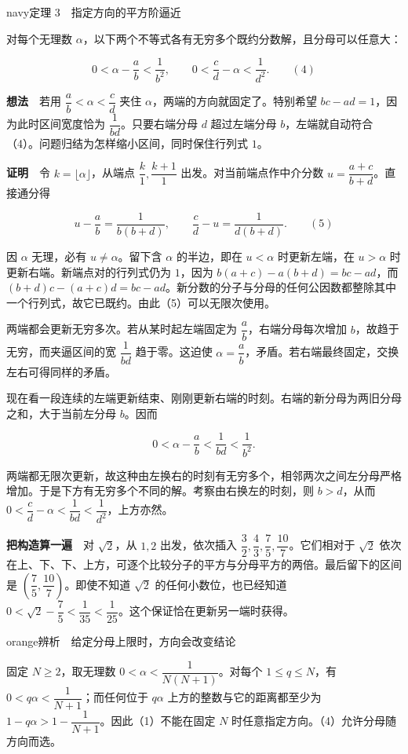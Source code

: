 \documentclass[11pt,a4paper]{article}
\begin{document}
\begin{sboxenv}{navy}{定理 3　指定方向的平方阶逼近}

对每个无理数 $\alpha$，以下两个不等式各有无穷多个既约分数解，且分母可以任意大：

\[
0<\alpha-\frac ab<\frac1{b^2},\qquad
0<\frac cd-\alpha<\frac1{d^2}.\qquad\mathrm{(4)}
\]
\end{sboxenv}

\textbf{想法}　若用 $\dfrac ab<\alpha<\dfrac cd$ 夹住 $\alpha$，两端的方向就固定了。特别希望 $bc-ad=1$，因为此时区间宽度恰为 $\dfrac1{bd}$。只要右端分母 $d$ 超过左端分母 $b$，左端就自动符合（4）。问题归结为怎样缩小区间，同时保住行列式 $1$。

\textbf{证明}　令 $k=\lfloor\alpha\rfloor$，从端点 $\dfrac k1,\dfrac{k+1}1$ 出发。对当前端点作中介分数 $u=\dfrac{a+c}{b+d}$。直接通分得

\[
u-\frac ab=\frac{1}{b(b+d)},\qquad
\frac cd-u=\frac{1}{d(b+d)}.\qquad\mathrm{(5)}
\]

因 $\alpha$ 无理，必有 $u\ne\alpha$。留下含 $\alpha$ 的半边，即在 $u<\alpha$ 时更新左端，在 $u>\alpha$ 时更新右端。新端点对的行列式仍为 $1$，因为 $b(a+c)-a(b+d)=bc-ad$，而 $(b+d)c-(a+c)d=bc-ad$。新分数的分子与分母的任何公因数都整除其中一个行列式，故它已既约。由此（5）可以无限次使用。

两端都会更新无穷多次。若从某时起左端固定为 $\dfrac ab$，右端分母每次增加 $b$，故趋于无穷，而夹逼区间的宽 $\dfrac1{bd}$ 趋于零。这迫使 $\alpha=\dfrac ab$，矛盾。若右端最终固定，交换左右可得同样的矛盾。

现在看一段连续的左端更新结束、刚刚更新右端的时刻。右端的新分母为两旧分母之和，大于当前左分母 $b$。因而

\[
0<\alpha-\frac ab<\frac1{bd}<\frac1{b^2}.
\]

两端都无限次更新，故这种由左换右的时刻有无穷多个，相邻两次之间左分母严格增加。于是下方有无穷多个不同的解。考察由右换左的时刻，则 $b>d$，从而 $0<\dfrac cd-\alpha<\dfrac1{bd}<\dfrac1{d^2}$，上方亦然。

\textbf{把构造算一遍}　对 $\sqrt2$，从 $1,2$ 出发，依次插入 $\dfrac32,\dfrac43,\dfrac75,\dfrac{10}{7}$。它们相对于 $\sqrt2$ 依次在上、下、下、上方，可逐个比较分子的平方与分母平方的两倍。最后留下的区间是 $(\dfrac75,\dfrac{10}{7})$。即使不知道 $\sqrt2$ 的任何小数位，也已经知道 $0<\sqrt2-\dfrac75<\dfrac1{35}<\dfrac1{25}$。这个保证恰在更新另一端时获得。

\begin{sboxenv}{orange}{辨析　给定分母上限时，方向会改变结论}

固定 $N\ge2$，取无理数 $0<\alpha<\dfrac1{N(N+1)}$。对每个 $1\le q\le N$，有 $0<q\alpha<\dfrac1{N+1}$；而任何位于 $q\alpha$ 上方的整数与它的距离都至少为 $1-q\alpha>1-\dfrac1{N+1}$。因此（1）不能在固定 $N$ 时任意指定方向。（4）允许分母随方向而选。
\end{sboxenv}
\end{document}
